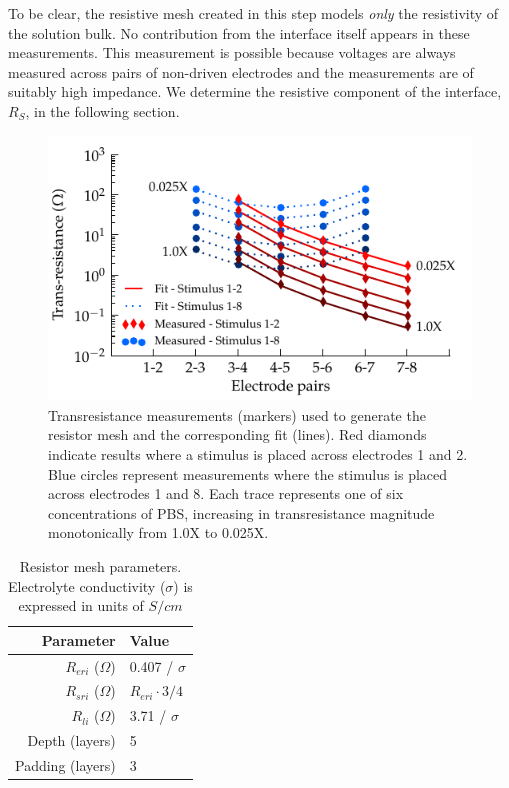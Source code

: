 \documentclass[journal, a4paper]{IEEEtran}
\begin{document}
To be clear, the resistive mesh created in this step models \textit{only} the resistivity of the solution bulk. No contribution from the interface itself appears in these measurements. This measurement is possible because voltages are always measured across pairs of non-driven electrodes and the measurements are of suitably high impedance. We determine the resistive component of the interface, $R_{S}$, in the following section.

\begin{figure}
    \begin{center}
        \includegraphics{graphics/pbs_transimpedance_IEEE}
    \end{center}
    \caption{Transresistance measurements (markers) used to generate the resistor mesh and the corresponding fit (lines). Red diamonds indicate results where a stimulus is placed across electrodes 1 and 2. Blue circles represent measurements where the stimulus is placed across electrodes 1 and 8. Each trace represents one of six concentrations of PBS, increasing in transresistance magnitude monotonically from 1.0X to 0.025X.}
    \label{fig:transresistance}
\end{figure}


\begin{table}
    \caption{Resistor mesh parameters. Electrolyte conductivity ($\sigma$) is expressed in units of $S / cm$}
    \label{tab:RESparams}
    \begin{center}
        \begin{tabular}{r | l}
            Parameter & Value \\
            \hline
            $R_{eri}$ ($\Omega$)& 0.407 / $\sigma$\\
            $R_{sri}$ ($\Omega$)& $R_{eri}\cdot 3/4$\\
            $R_{li}$ ($\Omega$)& 3.71 / $\sigma$ \\
            Depth (layers) & 5 \\
            Padding (layers) & 3 \\
        \end{tabular}
    \end{center}
\end{table}
\end{document}
